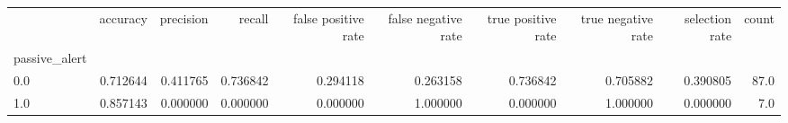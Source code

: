 \begin{tabular}{lrrrrrrrrr}
\toprule
{} &  accuracy &  precision &    recall &  false positive rate &  false negative rate &  true positive rate &  true negative rate &  selection rate &  count \\
passive\_alert &           &            &           &                      &                      &                     &                     &                 &        \\
\midrule
0.0           &  0.712644 &   0.411765 &  0.736842 &             0.294118 &             0.263158 &            0.736842 &            0.705882 &        0.390805 &   87.0 \\
1.0           &  0.857143 &   0.000000 &  0.000000 &             0.000000 &             1.000000 &            0.000000 &            1.000000 &        0.000000 &    7.0 \\
\bottomrule
\end{tabular}
